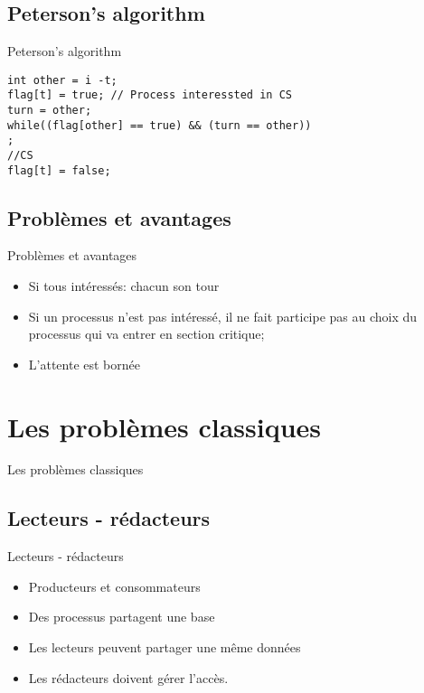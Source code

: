 \section{\sectitle}
\begin{frame}[containsverbatim]{\sectitle}
    \def\subsectitle{Peterson's algorithm}
    \subsection{\subsectitle}
    \begin{exampleblock}{\subsectitle}
        \begin{verbatim}
int other = i -t;
flag[t] = true; // Process interessted in CS
turn = other;
while((flag[other] == true) && (turn == other))
;
//CS
flag[t] = false;
        \end{verbatim}
    \end{exampleblock}


    \def\subsectitle{Problèmes et avantages}
    \subsection{\subsectitle}
    \begin{alertblock}{\subsectitle}
        \begin{itemize}
            \item Si tous intéressés: chacun son tour
            \item Si un processus n'est pas intéressé, il ne fait participe pas
                au choix du processus qui va entrer en section critique;
            \item L'attente est bornée
        \end{itemize}
    \end{alertblock}
\end{frame}

\def\sectitle{Les problèmes classiques}
\section{\sectitle}
\begin{frame}{\sectitle}
    \def\subsectitle{Lecteurs - rédacteurs}
    \subsection{\subsectitle}
    \begin{block}{\subsectitle}
        \begin{itemize}
            \item Producteurs et consommateurs
            \item Des processus partagent une base
            \item Les lecteurs peuvent partager une même données
            \item Les rédacteurs doivent gérer l'accès.
        \end{itemize}
    \end{block}
\end{frame}

